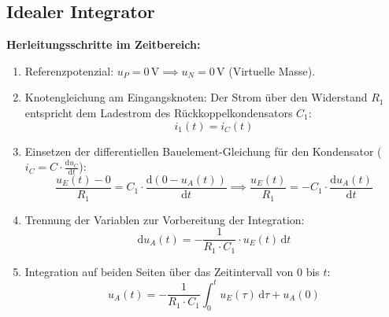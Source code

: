 \documentclass[11pt,a4paper]{article}
\begin{document}
\subsection{Idealer Integrator}
\textbf{Herleitungsschritte im Zeitbereich:}
\begin{enumerate}
    \item Referenzpotenzial: $u_P = 0\,\text{V} \implies u_N = 0\,\text{V}$ (Virtuelle Masse).
    \item Knotengleichung am Eingangsknoten: Der Strom über den Widerstand $R_1$ entspricht dem Ladestrom des Rückkoppelkondensators $C_1$:
    \begin{equation}
    i_1(t) = i_C(t)
    \end{equation}
    \item Einsetzen der differentiellen Bauelement-Gleichung für den Kondensator ($i_C = C \cdot \frac{\text{d}u_C}{\text{d}t}$):
    \begin{equation}
    \frac{u_E(t) - 0}{R_1} = C_1 \cdot \frac{\text{d}(0 - u_A(t))}{\text{d}t} \implies \frac{u_E(t)}{R_1} = -C_1 \cdot \frac{\text{d}u_A(t)}{\text{d}t}
    \end{equation}
    \item Trennung der Variablen zur Vorbereitung der Integration:
    \begin{equation}
    \text{d}u_A(t) = -\frac{1}{R_1 \cdot C_1} \cdot u_E(t) \,\text{d}t
    \end{equation}
    \item Integration auf beiden Seiten über das Zeitintervall von $0$ bis $t$:
    \begin{equation}
    u_A(t) = -\frac{1}{R_1 \cdot C_1} \int_{0}^{t} u_E(\tau) \,\text{d}\tau + u_A(0)
    \end{equation}
\end{enumerate}
\end{document}
